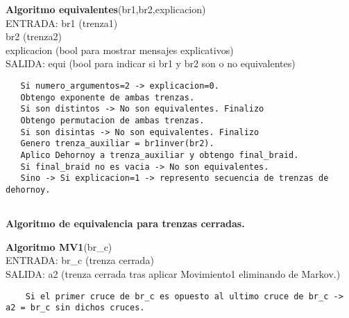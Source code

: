 \begin{alg}
	\textbf{Algoritmo equivalentes}(br1,br2,explicacion)\\
	ENTRADA: br1 (trenza1)\\
	\hspace*{2.2cm} br2 (trenza2)\\
	\hspace*{2.2cm} explicacion (bool para mostrar mensajes explicativos)\\
	SALIDA: \hspace{0.4cm} equi (bool para indicar si br1 y br2 son o no equivalentes)
	
\begin{lstlisting}
   Si numero_argumentos=2 -> explicacion=0.
   Obtengo exponente de ambas trenzas.
   Si son distintos -> No son equivalentes. Finalizo
   Obtengo permutacion de ambas trenzas.
   Si son disintas -> No son equivalentes. Finalizo
   Genero trenza_auxiliar = br1inver(br2).
   Aplico Dehornoy a trenza_auxiliar y obtengo final_braid.
   Si final_braid no es vacia -> No son equivalentes. 
   Sino -> Si explicacion=1 -> represento secuencia de trenzas de dehornoy.
    
\end{lstlisting}
\end{alg}

\bigskip
\begin{center}
	\textbf{Algoritmo de equivalencia para trenzas cerradas.}
\end{center} 


\begin{alg}
	\textbf{Algoritmo MV1}(br\_c)\\
	ENTRADA: br\_c (trenza cerrada)\\
	SALIDA: \hspace{0.4cm} a2 (trenza cerrada tras aplicar Movimiento1 eliminando de Markov.) 
	
\begin{lstlisting}
    Si el primer cruce de br_c es opuesto al ultimo cruce de br_c -> a2 = br_c sin dichos cruces.
\end{lstlisting}
\end{alg}

